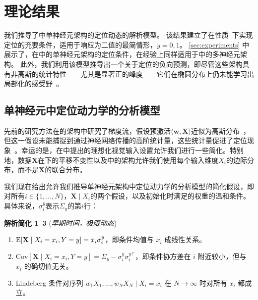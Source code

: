 \section{理论结果}
\label{sec:theory}

我们推导了中单神经元架构的定位动态的解析模型。
该结果建立了在性质~下实现定位的充要条件，适用于响应为二值的最简情形，\ie $y = 0,1$。
\cref{sec:experiments} 中展示了，在中的单神经元架构的定位条件，在经验上同样适用于中的多神经元架构。
此外，我们利用该模型推导出一个关于定位的负向预测，即尽管这些架构具有非高斯的统计特性——尤其是显著正的峰度——它们在椭圆分布上仍未能学习出局部化的感受野~\parencite[\cf 正峰度作为定位的目标函数或诊断工具,][]{hyvarinen2000independent,ingrosso2022data}。
\subsection{单神经元中定位动力学的分析模型}

先前的研究方法在的架构中研究了梯度流，假设预激活$\langle \mathbf{w}, \mathbf{X} \rangle$近似为高斯分布~\parencite{goldt2020modelling,gerace2020generalisation,goldt2022gaussian}，但这一假设未能捕捉到通过神经网络传播的高阶统计量，这些统计量促进了定位现象~\cite{ingrosso2022data}。幸运的是，在中提出的理想化视觉输入设置允许我们进行一些简化。特别地，数据$\mathbf{X}$在下的平移不变性以及中的架构允许我们使用每个输入维度$X_i$的边际分布，而不是$\mathbf{X}$的联合分布。

我们现在给出允许我们推导单神经元架构中定位动力学的分析模型的简化假设，即对所有$i \in \{1, \dots, N\}$，$\mathbf{X} \mid X_i$的两个假设，以及初始化时满足的权重的温和条件。具体来说，$\sigma_i^y$表示$\Sigma_y$的第$i$行：

\begin{analysis}{\textbf{解析简化 1--3} (\emph{早期时间，极限动态})}{}
\begin{enumerate}[series=assumenumi]
  \item \label{item:mean-assumption} $\operatorname{\mathbb{E}}[\mathbf{X} \mid X_i = x_i, Y = y] = x_i \sigma_i^y$，即条件均值与 $x_i$ 成线性关系。
  \item \label{item:covariance-assumption} $\text{Cov}[\mathbf{X} \mid X_i = x_i, Y = y] = \Sigma_y - \sigma_i^y \sigma_i^{y\top}$，即条件协方差在 $i$ 附近较小，但与 $x_i$ 的确切值无关。
  \item \label{item:lindeberg-condition} Lindeberg 条件对序列 $w_1 X_1, \ldots, w_N X_N \mid X_i = x_i$ 在 $N \to \infty$ 时对所有 $x_i$ 都成立。
\end{enumerate}
\end{analysis}

